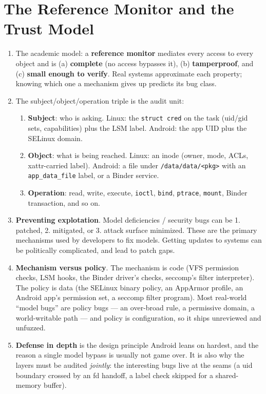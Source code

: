 \documentclass[12pt]{Training}
\begin{document}
\section*{The Reference Monitor and the Trust Model}
\begin{enumerate}
    \item The academic model: a \textbf{reference monitor} mediates every access to every object and is (a) \textbf{complete} (no access bypasses it), (b) \textbf{tamperproof}, and (c) \textbf{small enough to verify}. Real systems approximate each property; knowing which one a mechanism gives up predicts its bug class.
    \item The subject/object/operation triple is the audit unit:
    \begin{enumerate}
        \item \textbf{Subject}: who is asking. Linux: the \lstinline{struct cred} on the task (uid/gid sets, capabilities) plus the LSM label. Android: the app UID plus the SELinux domain.
        \item \textbf{Object}: what is being reached. Linux: an inode (owner, mode, ACLs, xattr-carried label). Android: a file under \lstinline{/data/data/<pkg>} with an \lstinline{app_data_file} label, or a Binder service.
        \item \textbf{Operation}: read, write, execute, \lstinline{ioctl}, \lstinline{bind}, \lstinline{ptrace}, \lstinline{mount}, Binder transaction, and so on.
    \end{enumerate}
    \item \textbf{Preventing explotation}. Model deficiencies / security bugs can be 1. patched, 2. mitigated, or 3. attack surface minimized. These are the primary mechanisms used by developers to fix models. Getting updates to systems can be politically complicated, and lead to patch gaps.
    \item \textbf{Mechanism versus policy}. The mechanism is code (VFS permission checks, LSM hooks, the Binder driver's checks, seccomp's filter interpreter). The policy is data (the SELinux binary policy, an AppArmor profile, an Android app's permission set, a seccomp filter program). Most real-world ``model bugs'' are policy bugs --- an over-broad rule, a permissive domain, a world-writable path --- and policy is configuration, so it ships unreviewed and unfuzzed.
    \item \textbf{Defense in depth} is the design principle Android leans on hardest, and the reason a single model bypass is usually not game over. It is also why the layers must be audited \emph{jointly}: the interesting bugs live at the seams (a uid boundary crossed by an fd handoff, a label check skipped for a shared-memory buffer).

\end{enumerate}
\end{document}

